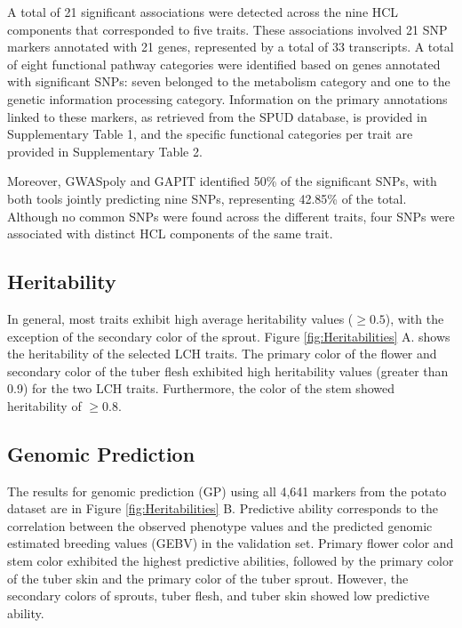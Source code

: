 \documentclass[pdflatex,sn-mathphys-ay]{sn-jnl}%
\begin{document}
A total of 21 significant associations were detected across the nine HCL components that corresponded to five traits. These associations involved 21 SNP markers annotated with 21 genes, represented by a total of 33 transcripts.  A total of eight functional pathway categories were identified based on genes annotated with significant SNPs: seven belonged to the metabolism category and one to the genetic information processing category. Information on the primary annotations linked to these markers, as retrieved from the SPUD database, is provided in Supplementary Table 1, and the specific functional categories per trait are provided in Supplementary Table 2.  

Moreover, GWASpoly and GAPIT identified 50\% of the significant SNPs, with both tools jointly predicting nine SNPs, representing 42.85\% of the total. Although no common SNPs were found across the different traits, four SNPs were associated with distinct HCL components of the same trait.%


\subsection{Heritability}

 In general, most traits exhibit high average heritability values ($\geq 0.5$), with the exception of the secondary color of the sprout. Figure \ref{fig:Heritabilities} A. shows the heritability of the selected LCH traits. The primary color of the flower and secondary color of the tuber flesh exhibited high heritability values (greater than 0.9) for the two LCH traits. Furthermore, the color of the stem showed heritability of $\geq 0.8$.

\subsection{Genomic Prediction}

The results for genomic prediction (GP) using all 4,641 markers from the potato dataset are in Figure \ref{fig:Heritabilities} B. Predictive ability corresponds to the correlation between the observed phenotype values and the predicted genomic estimated breeding values (GEBV) in the validation set. Primary flower color and stem color exhibited the highest predictive abilities, followed by the primary color of the tuber skin and the primary color of the tuber sprout. However, the secondary colors of sprouts, tuber flesh, and tuber skin showed low predictive ability.
\end{document}
